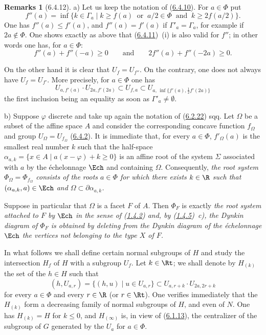 \documentclass[12pt,a4paper,oneside,english]{smfart}
\makeatletter
\newcommand{\btanchor}[1]{\leavevmode\Hy@raisedlink{\hypertarget{bt:#1}{}}}
\newcommand{\btpageanchor}[1]{\Hy@raisedlink{\hypertarget{p:#1}{}}}
\newcommand{\btref}[1]{\hyperlink{bt:#1}{#1}}
\newcommand{\btpage}[1]{\marginnote{p.~#1}\btpageanchor{#1}}
\newcommand{\pmark}[1]{\btpage{#1}}
\theoremstyle{definition}
\theoremstyle{bt}
\newtheorem{rems}{Remarks}
\makeatother
\begin{document}
\begin{rems}[6.4.12]\btanchor{6.4.12}
a) Let us keep the notation of (\btref{6.4.10}). For $a\in\Phi$ put
\[
  f''(a)=\inf\{k\in\Gamma_a\mid k\geq f(a)\ \text{ or }\    a/2\in\Phi\ \text{ and }\ k\geq2f(a/2)\}.
\]
One has $f''(a)\leq f'(a)$, and $f''(a)=f'(a)$ if $\Gamma'_a=\Gamma_a$, for
example if $2a\notin\Phi$. One shows exactly as above that (\btref{6.4.11})~(i) is
also valid for $f''$; in other words one has, for $a\in\Phi$:
\begin{equation}
  f''(a)+f''(-a)\geq0\qquad\text{and}\qquad 2f''(a)+f''(-2a)\geq0.
\end{equation}

On the other hand it is clear that $U_f=U_{f''}$. On the contrary, one does
not always have $U_f=U_{f'}$. More precisely, for $a\in\Phi$ one has
\begin{equation}
  U_{a,f'(a)}\cdot U_{2a,f'(2a)}\subset U_{f,a}\subset
   U_{a,\,\inf\{f'(a),\frac12 f'(2a)\}}
\end{equation}
the first inclusion being an equality as soon as $\Gamma'_a\neq\emptyset$.

b) Suppose $\varphi$ discrete and take up again the notation of (\btref{6.2.22})
sqq. Let $\Omega$ be a subset of the affine space $A$ and consider the
corresponding concave function $f_{\Omega}$ and group
$U_{\Omega}=U_{f_{\Omega}}$ (\btref{6.4.2}). It is immediate that, for every
$a\in\Phi$, $f'_{\Omega}(a)$ is the smallest real number $k$ such that the
half-space $\alpha_{a,k}=\{x\in A\mid a(x-\varphi)+k\geq0\}$ is an affine
root of the system $\Sigma$ associated with $a$ by the échelonnage $\Ech$
and containing $\Omega$. Consequently, \emph{the root system
$\Phi_{\Omega}=\Phi_{f_{\Omega}}$ consists of the roots $a\in\Phi$ for which
there exists $k\in\R$ such that $(\alpha_{a,k},a)\in\Ech$ and
$\Omega\subset\partial\alpha_{a,k}$.}

Suppose in particular that $\Omega$ is a facet $F$ of $A$. Then $\Phi_F$ is
exactly
\pmark{139}
\emph{the root system attached to $F$ by $\Ech$ in the sense of (\btref{1.4.2})
and, by (\btref{1.4.5})~c), the Dynkin diagram of $\Phi_F$ is obtained by deleting
from the Dynkin diagram of the échelonnage $\Ech$ the vertices not
belonging to the type $X$ of $F$.}
\end{rems}

\btanchor{6.4.13}
In what follows we shall define certain normal subgroups of $H$ and study
the intersection $H_f$ of $H$ with a subgroup $U_f$. Let $k\in\Rt$; we
shall denote by $H_{(k)}$ the set of the $h\in H$ such that
\[
  (h,U_{a,r})=\{(h,u)\mid u\in U_{a,r}\}\subset U_{a,r+k}\cdot U_{2a,2r+k}
\]
for every $a\in\Phi$ and every $r\in\R$ (or $r\in\Rt$). One verifies
immediately that the $H_{(k)}$ form a decreasing family of normal subgroups
of $H$, and even of $N$. One has $H_{(k)}=H$ for $k\leq0$, and
$H_{(\infty)}$ is, in view of (\btref{6.1.13}), the centralizer of the subgroup of
$G$ generated by the $U_a$ for $a\in\Phi$.
\end{document}
